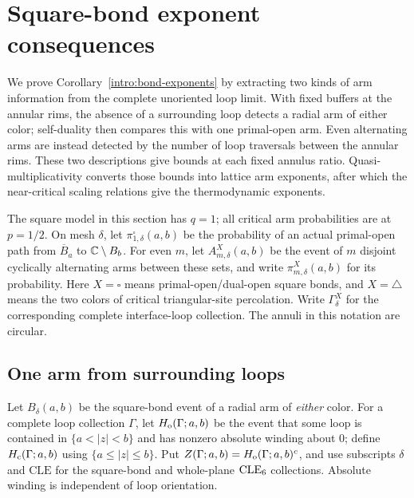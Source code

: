 \section{Square-bond exponent consequences}
\label{sec:percolation-exponents}

We prove Corollary~\ref{intro:bond-exponents} by extracting two kinds of
arm information from the complete unoriented loop limit.  With fixed
buffers at the annular rims, the absence of a surrounding loop detects
a radial arm of either color; self-duality
then compares this with one primal-open arm.  Even alternating arms
are instead detected by the number of loop traversals between the
annular rims.  These two descriptions give bounds at each fixed
annulus ratio.  Quasi-multiplicativity converts those bounds into
lattice arm exponents, after which the near-critical scaling relations
give the thermodynamic exponents.

The square model in this section has $q=1$; all critical arm
probabilities are at $p=1/2$.  On mesh $\delta$, let
$\pi^\square_{1,\delta}(a,b)$ be the
probability of an actual primal-open path from $\overline B_a$ to
$\mathbb C\setminus B_b$.  For even $m$, let $A^X_{m,\delta}(a,b)$ be the
event of $m$ disjoint cyclically alternating arms between these sets,
and write $\pi^X_{m,\delta}(a,b)$ for its probability.  Here
$X=\square$ means primal-open/dual-open square bonds, and $X=\triangle$
means the two colors of critical triangular-site percolation.
Write $\Gamma^X_\delta$ for the corresponding complete interface-loop
collection.  The annuli in this notation are circular.

\subsection{One arm from surrounding loops}
Let $B_\delta(a,b)$ be the square-bond event of a radial arm of
\emph{either} color.  For a complete loop collection $\Gamma$, let
$H_{\rm o}(\Gamma;a,b)$ be the event that some loop is contained in
$\{a<|z|<b\}$ and has nonzero absolute winding about $0$; define
$H_{\rm c}(\Gamma;a,b)$ using $\{a\le |z|\le b\}$.  Put
$Z(\Gamma;a,b)=H_{\rm o}(\Gamma;a,b)^c$, and use subscripts $\delta$
and $\mathrm{CLE}$ for the square-bond and whole-plane $\operatorname{CLE}_6$
collections.  Absolute winding is independent of loop orientation.

